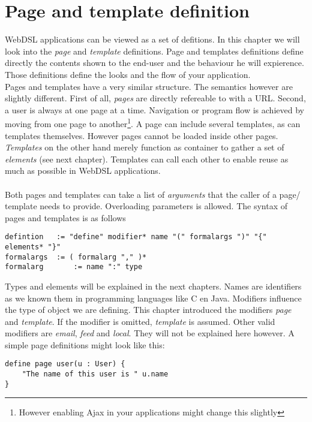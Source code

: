 \chapter{Page and template definition}
WebDSL applications can be viewed as a set of defitions. In this chapter we will look into the \emph{page} and \emph{template} definitions. Page and templates definitions define directly the contents shown to the end-user and the behaviour he will expierence. Those definitions define the looks and the flow of your application. 
\\
Pages and templates have a very similar structure. The semantics however are slightly different. First of all, \emph{pages} are directly refereable to with a URL. Second, a user is always at one page at a time. Navigation or program flow is achieved by moving from one page to another\footnote{However enabling Ajax in your applications might change this slightly}. A page can include several templates, as can templates themselves. However pages cannot be loaded inside other pages. 
\\
\emph{Templates} on the other hand merely function as container to gather a set of \emph{elements} (see next chapter). Templates can call each other to enable reuse as much as possible in WebDSL applications. 
\\
\\
Both pages and templates can take a list of \emph{arguments} that the caller of a page/ template needs to provide. Overloading parameters is allowed. The syntax of pages and templates is as follows
\begin{lstlisting}
defintion 	:= "define" modifier* name "(" formalargs ")" "{" elements* "}"
formalargs 	:= ( formalarg "," )*
formalarg		:= name ":" type
\end{lstlisting}
Types and elements will be explained in the next chapters. Names are identifiers as we known them in programming languages like C en Java. Modifiers influence the type of object we are defining. This chapter introduced the modifiers \emph{page} and \emph{template}. If the modifier is omitted, \emph{template} is assumed. Other valid modifiers are \emph{email}, \emph{feed} and \emph{local}. They will not be explained here however. A simple page definitions might look like this:
\begin{lstlisting}
define page user(u : User) {
	"The name of this user is " u.name
}
\end{lstlisting}

